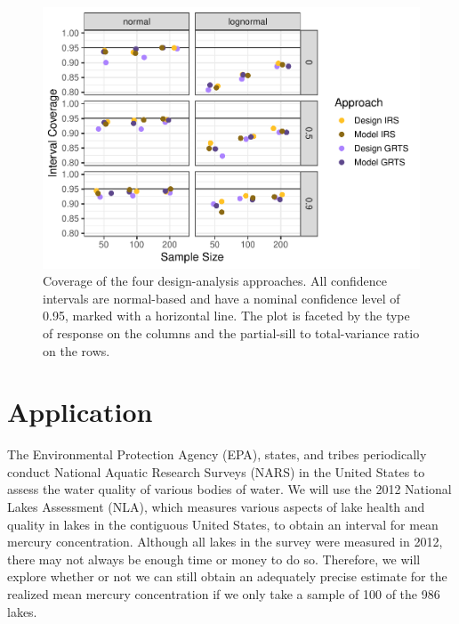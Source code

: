 \documentclass[]{elsarticle} %
\begin{document}
\begin{figure}
\includegraphics[width=1\linewidth]{manuscript_files/figure-latex/figconf-1} \caption{Coverage of the four design-analysis approaches. All confidence intervals are normal-based and have a nominal confidence level of 0.95, marked with a horizontal line. The plot is faceted by the type of response on the columns and the partial-sill to total-variance ratio on the rows.}\label{fig:figconf}
\end{figure}

\hypertarget{application}{%
\section{Application}\label{application}}

The Environmental Protection Agency (EPA), states, and tribes
periodically conduct National Aquatic Research Surveys (NARS) in the
United States to assess the water quality of various bodies of water. We
will use the 2012 National Lakes Assessment (NLA), which measures
various aspects of lake health and quality in lakes in the contiguous
United States, to obtain an interval for mean mercury concentration.
Although all lakes in the survey were measured in 2012, there may not
always be enough time or money to do so. Therefore, we will explore
whether or not we can still obtain an adequately precise estimate for
the realized mean mercury concentration if we only take a sample of 100
of the 986 lakes.
\end{document}
